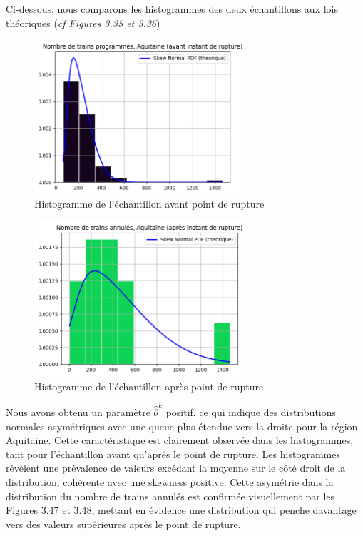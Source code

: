 {Ci-dessous, nous comparons les histogrammes des deux échantillons aux lois théoriques (\textit{cf Figures 3.35 et 3.36})

\begin{figure}[H]
  \centering
  \includegraphics[width=0.7\textwidth]{image/AQ-FIG11.png}
  \caption{Histogramme de l'échantillon avant point de rupture}
\end{figure}

\begin{figure}[H]
  \centering
  \includegraphics[width=0.7\textwidth]{image/AQ-FIG12.png}
  \caption{Histogramme de l'échantillon après point de rupture}
\end{figure}

Nous avons obtenu un paramètre $\hat{\theta}^k$ positif, ce qui indique des distributions normales asymétriques avec une queue plus étendue vers la droite pour la région Aquitaine. Cette caractéristique est clairement observée dans les histogrammes, tant pour l'échantillon avant qu'après le point de rupture. Les histogrammes révèlent une prévalence de valeurs excédant la moyenne sur le côté droit de la distribution, cohérente avec une skewness positive. Cette asymétrie dans la distribution du nombre de trains annulés est confirmée visuellement par les Figures 3.47 et 3.48, mettant en évidence une distribution qui penche davantage vers des valeurs supérieures après le point de rupture.



}
